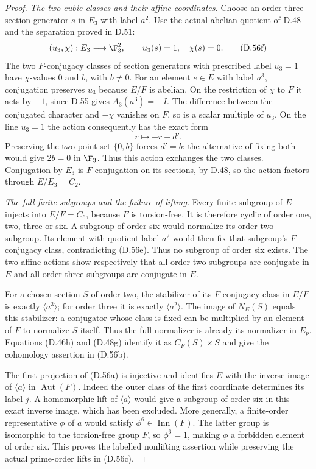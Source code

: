 \begin{proof}
\emph{The two cubic classes and their affine coordinates.}
Choose an order-three section generator $s$
in $E_3$ with label $a^2$.
Use the actual abelian quotient of D.48 and
the separation proved in D.51:
\[
 (u_3,\chi):E_3\longrightarrow\F_3^2,
 \qquad u_3(s)=1,\quad\chi(s)=0.                        \tag{D.56f}
\]
The two $F$-conjugacy classes of section
generators with prescribed label $u_3=1$
have $\chi$-values $0$ and $b$, with
$b\ne0$.
For an element $e\in E$ with label $a^3$,
conjugation preserves $u_3$ because $E/F$
is abelian.  On the restriction of $\chi$
to $F$ it acts by $-1$, since D.55 gives
$A_3(a^3)=-I$.
The difference between the conjugated
character and $-\chi$ vanishes on $F$,
so is a scalar multiple of $u_3$.
On the line $u_3=1$ the action consequently
has the exact form
\[
                              r\longmapsto-r+d'.        \tag{D.56g}
\]
Preserving the two-point set $\{0,b\}$
forces $d'=b$: the alternative of fixing
both would give $2b=0$ in $\F_3$.
Thus this action exchanges the two classes.
Conjugation by $E_3$ is $F$-conjugation on
its sections, by D.48, so the action factors
through $E/E_3=C_2$.

\emph{The full finite subgroups and the failure of lifting.}
Every finite subgroup of $E$ injects into
$E/F=C_6$, because $F$ is torsion-free.
It is therefore cyclic of order one, two,
three or six.  A subgroup of order six
would normalize its order-two subgroup.
Its element with quotient label $a^2$
would then fix that subgroup's
$F$-conjugacy class, contradicting
(D.56e).  Thus no subgroup of order six
exists.
The two affine actions show respectively
that all order-two subgroups are conjugate
in $E$ and all order-three subgroups are
conjugate in $E$.

For a chosen section $S$ of order two,
the stabilizer of its $F$-conjugacy class
in $E/F$ is exactly $\langle a^3\rangle$;
for order three it is exactly
$\langle a^2\rangle$.
The image of $N_E(S)$ equals this
stabilizer: a conjugator whose class is
fixed can be multiplied by an element
of $F$ to normalize $S$ itself.
Thus the full normalizer is already
its normalizer in $E_p$.
Equations (D.46h) and (D.48g) identify
it as $C_F(S)\times S$ and give the
cohomology assertion in (D.56b).

The first projection of (D.56a) is
injective and identifies $E$ with the
inverse image of $\langle a\rangle$
in $\operatorname{Aut}(F)$.
Indeed the outer class of the first
coordinate determines its label $j$.
A homomorphic lift of $\langle a\rangle$
would give a subgroup of order six in
this exact inverse image, which has
been excluded.
More generally, a finite-order
representative $\phi$ of $a$ would
satisfy $\phi^6\in\operatorname{Inn}(F)$.
The latter group is isomorphic to the
torsion-free group $F$, so
$\phi^6=1$, making $\phi$ a forbidden
element of order six.
This proves the labelled nonlifting
assertion while preserving the actual
prime-order lifts in (D.56c).


\end{proof}
